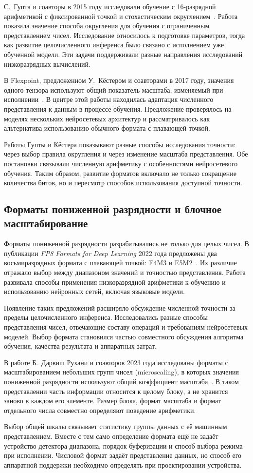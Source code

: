 С.~Гупта и соавторы в 2015 году исследовали обучение
с 16-разрядной арифметикой с фиксированной точкой
и стохастическим округлением~\cite{gupta2015}.
Работа показала значение способа округления для обучения
с ограниченным представлением чисел. Исследование относилось
к подготовке параметров, тогда как развитие целочисленного
инференса было связано с исполнением уже обученной модели.
Эти задачи поддерживали разные направления исследований
низкоразрядных вычислений.

В Flexpoint, предложенном У.~Кёстером и соавторами
в 2017 году, значения одного тензора используют общий
показатель масштаба, изменяемый при исполнении~\cite{flexpoint2017}.
В центре этой работы находилась адаптация численного
представления к данным в процессе обучения.
Предложение проверялось на моделях нескольких нейросетевых
архитектур и рассматривалось как альтернатива использованию
обычного формата с плавающей точкой.

Работы Гупты и Кёстера показывают разные способы исследования
точности: через выбор правила округления и через изменение
масштаба представления. Обе постановки связывали численную
арифметику с особенностями нейросетевого обучения.
Таким образом, развитие форматов включало не только
сокращение количества битов, но и пересмотр способов
использования доступной точности.

\subsection{Форматы пониженной разрядности и блочное масштабирование}

Форматы пониженной разрядности разрабатывались не только для целых чисел.
В публикации \textit{FP8 Formats for Deep Learning} 2022 года
предложены два восьмиразрядных формата с плавающей точкой:
E4M3 и E5M2~\cite{fp82022}. Их различие отражало выбор между
диапазоном значений и точностью представления.
Работа развивала способы применения низкоразрядной арифметики
к обучению и использованию нейронных сетей, включая
языковые модели.

Появление таких предложений расширяло обсуждение численной
точности за пределы целочисленного инференса. Исследовались
разные способы представления чисел, отвечающие составу
операций и требованиям нейросетевых моделей.
Выбор формата становился частью совместного обсуждения
алгоритма обучения, качества результата и аппаратных затрат.

В работе Б.~Дарвиш Рухани и соавторов 2023 года исследованы форматы с
масштабированием небольших групп чисел (microscaling), в которых значения
пониженной разрядности используют общий коэффициент масштаба~\cite{mx2023}.
В таком представлении часть информации относится к целому блоку,
а не хранится заново в каждом его элементе. Размер блока,
формат масштаба и формат отдельного числа совместно определяют
поведение арифметики.

Выбор общей шкалы связывает статистику группы данных
с её машинным представлением.
Вместе с тем само определение формата ещё не задаёт устройство
детектора диапазона, порядок буферизации и способ выбора режима
при исполнении. Числовой формат задаёт представление данных, но способ его аппаратной
поддержки необходимо определять при проектировании устройства.
